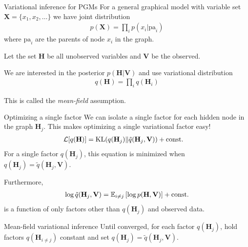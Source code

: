 \documentclass[10pt, compress]{beamer}
\begin{document}
\begin{frame}{Variational inference for PGMs}
  For a general graphical model
  with variable set $\mathbf{X} = \{x_1, x_2, \ldots\}$
  we have joint distribution
  \begin{align*}
    p(\mathbf{X}) = \prod_i p(x_i | \textrm{pa}_i)
  \end{align*}
  where $\textrm{pa}_i$ are the parents of node $x_i$
  in the graph.


  \pause
  Let the set $\mathbf{H}$ be
  all unobserved variables and $\mathbf{V}$ be the observed.


  \pause
  We are interested in the posterior $p(\mathbf{H} | \mathbf{V})$
  and use variational distribution 
  \begin{align*}
    q(\mathbf{H}) = \prod_i q(\mathbf{H}_i)
  \end{align*}

  \pause
  This is called the \emph{mean-field} assumption.

\end{frame}


\begin{frame}{Optimizing a single factor}
  We can isolate a single factor for each hidden node in the graph $\mathbf{H}_j$.
  This makes optimizing a single variational factor easy!
  \pause
  \begin{align*}
    \mathcal{L}[q(\mathbf{H})] &= \textrm{KL}(q(\mathbf{H}_j)\|\tilde{q}(\mathbf{H}_j, \mathbf{V}))  + \textrm{const.}
  \end{align*}
  \pause
  For a single factor $q(\mathbf{H}_j)$, this equation is minimized
  when $q(\mathbf{H}_j) = \tilde{q}(\mathbf{H}_j, \mathbf{V})$.

  \pause
  Furthermore, 
  \begin{align*}
    \log\tilde{q}(\mathbf{H}_j, \mathbf{V}) = \mathbb{E}_{i \neq j}\left[\log p(\mathbf{H}, \mathbf{V})\right] + \textrm{const.}
  \end{align*}
  is a function of only factors other than $q(\mathbf{H}_j)$  and observed data.

  \pause
  \begin{block}{Mean-field variational inference}
    Until converged,
    for each factor $q(\mathbf{H}_j)$,
    hold factors $q(\mathbf{H}_{i \neq j})$ constant and
    set $q(\mathbf{H}_j) = \tilde{q}(\mathbf{H}_j, \mathbf{V})$.
  \end{block}
\end{frame}
\end{document}
